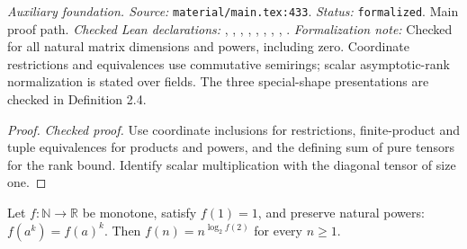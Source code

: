 \noindent\textit{Auxiliary foundation. Source:} \texttt{material/main.tex:433}.
\textit{Status:} \texttt{formalized}. Main proof path.
\textit{Checked Lean declarations:} , , , , , , , , .
\textit{Formalization note:} Checked for all natural matrix dimensions and powers, including zero. Coordinate restrictions and equivalences use commutative semirings; scalar asymptotic-rank normalization is stated over fields. The three special-shape presentations are checked in Definition 2.4.

\begin{proof}
\leanok
{}
\textit{Checked proof.} Use coordinate inclusions for restrictions, finite-product and tuple equivalences for products and powers, and the defining sum of pure tensors for the rank bound. Identify scalar multiplication with the diagonal tensor of size one.
\end{proof}

\renewcommand{\thetheorem}{A44}
\begin{lemma}
\label{aux:monotone-power-functions}
\leanok
Let $f:\mathbb N\to\mathbb R$ be monotone, satisfy $f(1)=1$, and preserve natural powers: $f(a^k)=f(a)^k$. Then $f(n)=n^{\log_2 f(2)}$ for every $n\ge1$.
\end{lemma}

